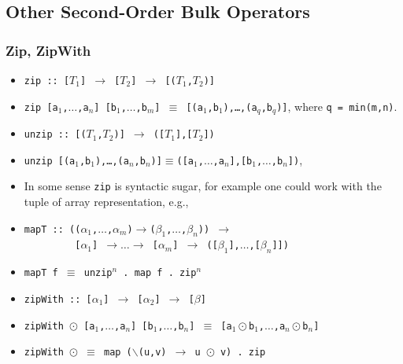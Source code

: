 \documentclass{beamer}
\renewcommand{\emph}[1]{\textcolor{structure}{#1}}
\newcommand{\emp}[1]{\textcolor{DikuRed}{ #1}}
\begin{document}
\subsection{Other Second-Order Bulk Operators}

\begin{frame}[fragile,t]
  \frametitle{Zip, ZipWith}

\begin{itemize}
    \item \emph{\tt zip :: [$T_1$] $\rightarrow$ [$T_2$] $\rightarrow$ [($T_1$,$T_2$)]}
    \item \emp{\tt zip [a$_1$,$\ldots$,a$_n$] [b$_1$,$\ldots$,b$_m$] $\equiv$ [(a$_1$,b$_1$),\ldots,(a$_q$,b$_q$)]},
            where {\tt q = min(m,n)}.
    \item \emph{\tt unzip :: [($T_1$,$T_2$)] $\rightarrow$ ([$T_1$],[$T_2$])}
    \item \emp{\tt unzip [(a$_1$,b$_1$),\ldots,(a$_n$,b$_n$)]$\equiv$([a$_1$,$\ldots$,a$_n$],[b$_1$,$\ldots$,b$_n$])},\medskip

    \item In some sense {\tt zip} is syntactic sugar, for example one could work with the
            tuple of array representation, e.g.,
    \item \emp{\tt mapT :: (($\alpha_1$,$\ldots$,$\alpha_m$)$\rightarrow$($\beta_1$,$\ldots$,$\beta_n$)) $\rightarrow$}\\ 
          \emp{\tt~~~~~~~~~[$\alpha_1$] $\rightarrow\ldots\rightarrow$ [$\alpha_m$] $\rightarrow$ ([$\beta_1$],$\ldots$,[$\beta_n$]])}
    \item \emph{\tt mapT f $\equiv$ unzip$^n$ . map f . zip$^n$}\medskip

    \item {\tt zipWith :: [$\alpha_1$] $\rightarrow$ [$\alpha_2$] $\rightarrow$ [$\beta$]}
    \item {\tt zipWith $\odot$ [a$_1$,$\ldots$,a$_n$] [b$_1$,$\ldots$,b$_n$] $\equiv$ [a$_1\odot$b$_1$,$\ldots$,a$_n\odot$b$_n$]}
    \item {\tt zipWith $\odot$ $\equiv$ map ($\backslash$(u,v) $\rightarrow$ u $\odot$ v) . zip}
\end  {itemize}

\end{frame}
\end{document}
